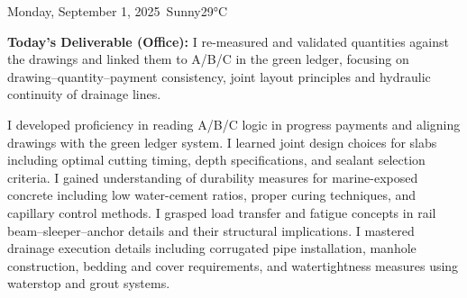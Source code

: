 \begin{dailyentry}{Monday, September 1, 2025}{\weathersunny\ Sunny}{29°C}
\begin{workcontent}
\begin{center}
{%
}
\end{center}

\textbf{Today’s Deliverable (Office):} I re-measured and validated quantities against the drawings and linked them to A/B/C in the green ledger, focusing on drawing–quantity–payment consistency, joint layout principles and hydraulic continuity of drainage lines.
\end{workcontent}

\begin{skillslearned}
\item[] I developed proficiency in reading A/B/C logic in progress payments and aligning drawings with the green ledger system. I learned joint design choices for slabs including optimal cutting timing, depth specifications, and sealant selection criteria. I gained understanding of durability measures for marine-exposed concrete including low water-cement ratios, proper curing techniques, and capillary control methods. I grasped load transfer and fatigue concepts in rail beam–sleeper–anchor details and their structural implications. I mastered drainage execution details including corrugated pipe installation, manhole construction, bedding and cover requirements, and watertightness measures using waterstop and grout systems.
\end{skillslearned}


\end{dailyentry}
